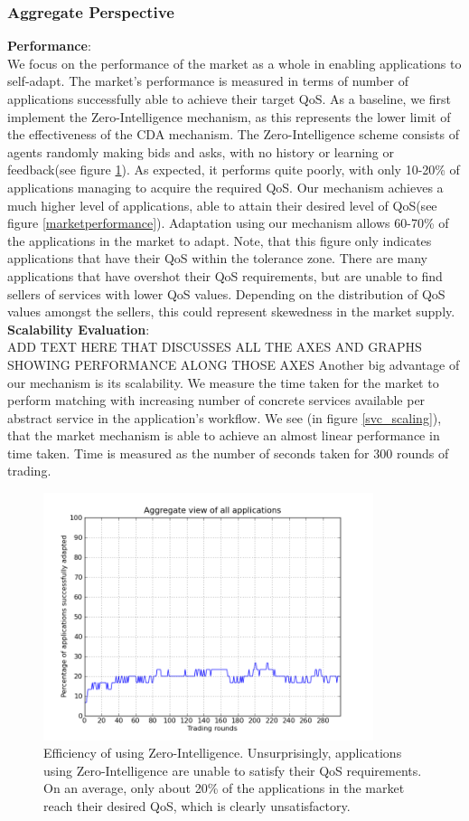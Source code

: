 \documentclass[10pt,journal,compsoc]{IEEEtran}
\begin{document}
\subsubsection{Aggregate Perspective}
\textbf{Performance}:\\
We focus on the performance of the market as a whole in enabling applications to self-adapt. The market's performance is measured in terms of number of applications successfully able to achieve their target QoS. As a baseline, we first implement the Zero-Intelligence mechanism, as this represents the lower limit of the effectiveness of the CDA mechanism. The Zero-Intelligence scheme consists of agents randomly making bids and asks, with no history or learning or feedback(see figure \ref{pure_random_strategy}). As expected, it performs quite poorly, with only 10-20\% of applications managing to acquire the required QoS. Our mechanism achieves a much higher level of applications, able to attain their desired level of QoS(see figure \ref{marketperformance}). Adaptation using our mechanism allows 60-70\% of the applications in the market to adapt. Note, that this figure only indicates applications that have their QoS within the tolerance zone. There are many applications that have overshot their QoS requirements, but are unable to find sellers of services with lower QoS values. Depending on the distribution of QoS values amongst the sellers, this could represent skewedness in the market supply.\\
\textbf{Scalability Evaluation}:\\    
ADD TEXT HERE THAT DISCUSSES ALL THE AXES AND GRAPHS SHOWING PERFORMANCE ALONG THOSE AXES
Another big advantage of our mechanism is its scalability. We measure the time taken for the market to perform matching with increasing number of concrete services available per abstract service in the application's workflow.  We see (in figure \ref{svc_scaling}), that the market mechanism is able to achieve an almost linear performance in time taken. Time is measured as the number of seconds taken for 300 rounds of trading.\\
\begin{figure}
    \includegraphics[width=3.8in]{graphs/efficiency-of-zi.png}
    \caption{Efficiency of using Zero-Intelligence. Unsurprisingly, applications using Zero-Intelligence are unable to satisfy their QoS requirements. On an average, only about 20\% of the applications in the market reach their desired QoS, which is clearly unsatisfactory.}
    \label{pure_random_strategy}
\end{figure}
\end{document}
